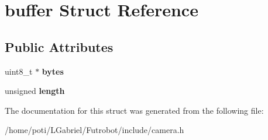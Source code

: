 \hypertarget{structbuffer}{}\section{buffer Struct Reference}
\label{structbuffer}
\subsection*{Public Attributes}
\begin{DoxyCompactItemize}
\item 
uint8\+\_\+t $\ast$ {\bfseries bytes}\hypertarget{structbuffer_ae1e75129521b492417370001c616f3cb}{}\label{structbuffer_ae1e75129521b492417370001c616f3cb}

\item 
unsigned {\bfseries length}\hypertarget{structbuffer_acd3987e281e62ee608f7c39f50db9154}{}\label{structbuffer_acd3987e281e62ee608f7c39f50db9154}

\end{DoxyCompactItemize}


The documentation for this struct was generated from the following file\+:\begin{DoxyCompactItemize}
\item 
/home/poti/\+L\+Gabriel/\+Futrobot/include/camera.\+h\end{DoxyCompactItemize}
